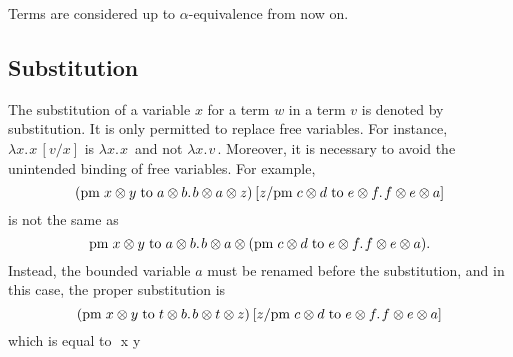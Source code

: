 \begin{convention}
  Terms are considered up to $\alpha$-equivalence from now on.
\end{convention}

\subsection{Substitution}


The substitution of a variable $x$ for a term $w$ in a term $v$ is denoted by \gls{substitution}. It is only  permitted  to replace free variables. For instance, $\lambda x. \hspace{1pt} x  \hspace{2pt} [v/x]$ is $\lambda x. \hspace{1pt} x  \hspace{2pt}$ and not  $\lambda x. \hspace{1pt} v  \hspace{2pt}$. Moreover, it is necessary to avoid the unintended binding of free variables. For example, $$(\text{pm} \hspace{3 pt} x \otimes y\hspace{3 pt} \text{to} \hspace{3 pt} a \otimes b. \hspace{1pt} b \otimes a \otimes z) \hspace{2 pt}  [z/\text{pm} \hspace{3 pt} c \otimes d\hspace{3 pt} \text{to} \hspace{3 pt} e \otimes f. \hspace{1pt} f \otimes e \otimes a]$$ is not the same as $$\text{pm} \hspace{3 pt} x \otimes y\hspace{3 pt} \text{to} \hspace{3 pt} a \otimes b. \hspace{1pt} b \otimes a \otimes (\text{pm} \hspace{3 pt} c \otimes d\hspace{3 pt} \text{to} \hspace{3 pt} e \otimes f. \hspace{1pt} f \otimes e \otimes a ). $$ Instead, the bounded variable $a$ must be renamed before the substitution, and in this case, the proper substitution is $$(\text{pm} \hspace{3 pt} x \otimes y\hspace{3 pt} \text{to} \hspace{3 pt} t \otimes b. \hspace{1pt} b \otimes t \otimes z) \hspace{2 pt}  [z/\text{pm} \hspace{3 pt} c \otimes d\hspace{3 pt} \text{to} \hspace{3 pt} e \otimes f. \hspace{1pt} f \otimes e \otimes a]$$ which is equal to $$ \hspace{3 pt} x \otimes y\hspace{3 pt} 